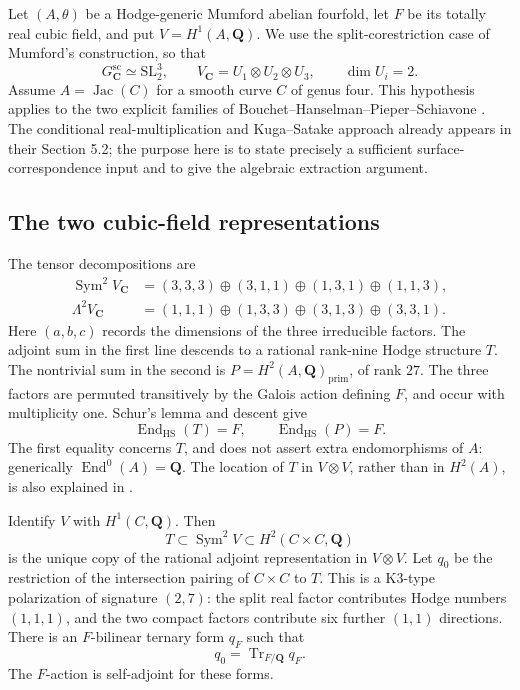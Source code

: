 \documentclass[11pt]{article}
\theoremstyle{definition}
\theoremstyle{remark}
\begin{document}
Let $(A,\theta)$ be a Hodge-generic Mumford abelian fourfold, let $F$ be
its totally real cubic field, and put $V=H^1(A,\mathbf Q)$.  We use the
split-corestriction case of Mumford's construction, so that
\[
 G^{\mathrm{sc}}_{\mathbf C}\simeq\mathrm{SL}_2^3,
 \qquad V_{\mathbf C}=U_1\otimes U_2\otimes U_3,
 \qquad \dim U_i=2.
\]
Assume $A=\operatorname{Jac}(C)$ for a smooth curve $C$ of genus four.
This hypothesis applies to the two explicit families of
Bouchet--Hanselman--Pieper--Schiavone
\cite[Theorem 1.2]{BHPS}.  The conditional real-multiplication and
Kuga--Satake approach already appears in their Section 5.2; the purpose
here is to state precisely a sufficient surface-correspondence input
and to give the algebraic extraction argument.

\subsection{The two cubic-field representations}

The tensor decompositions are
\begin{align*}
 \operatorname{Sym}^2V_{\mathbf C}
  &=(3,3,3)\oplus(3,1,1)\oplus(1,3,1)\oplus(1,1,3),\\
 \Lambda^2V_{\mathbf C}
  &=(1,1,1)\oplus(1,3,3)\oplus(3,1,3)\oplus(3,3,1).
\end{align*}
Here $(a,b,c)$ records the dimensions of the three irreducible factors.
The adjoint sum in the first line descends to a rational rank-nine
Hodge structure $T$.  The nontrivial sum in the second is
$P=H^2(A,\mathbf Q)_{\mathrm{prim}}$, of rank $27$.
The three factors are permuted transitively by the Galois action defining
$F$, and occur with multiplicity one.  Schur's lemma and descent give
\[
 \operatorname{End}_{\mathrm{HS}}(T)=F,
 \qquad \operatorname{End}_{\mathrm{HS}}(P)=F.
\]
The first equality concerns $T$, and does not assert extra endomorphisms
of $A$: generically $\operatorname{End}^0(A)=\mathbf Q$.
The location of $T$ in $V\otimes V$, rather than in $H^2(A)$, is also
explained in \cite[Section 2.3]{Zhu}.

Identify $V$ with $H^1(C,\mathbf Q)$.  Then
\[
 T\subset \operatorname{Sym}^2V\subset H^2(C\times C,\mathbf Q)
\]
is the unique copy of the rational adjoint representation in $V\otimes V$.
Let $q_0$ be the restriction of the intersection pairing of $C\times C$
to $T$.  This is a K3-type polarization of signature $(2,7)$: the split
real factor contributes Hodge numbers $(1,1,1)$, and the two compact
factors contribute six further $(1,1)$ directions.  There is an
$F$-bilinear ternary form $q_F$ such that
\[
 q_0=\operatorname{Tr}_{F/\mathbf Q}q_F.
\]
The $F$-action is self-adjoint for these forms.
\end{document}
